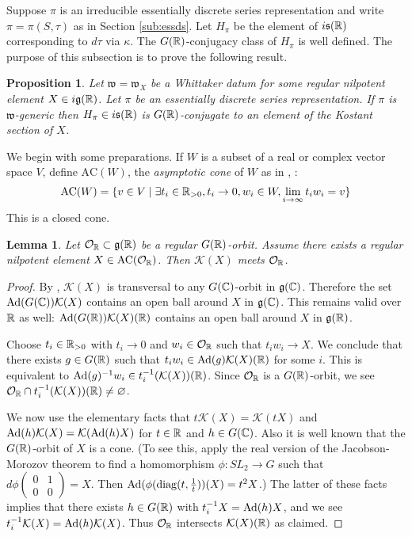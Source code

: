 \documentclass{article}
\newtheorem{lem}[thm]{Lemma}
\newtheorem{pro}[thm]{Proposition}
\theoremstyle{definition}
\numberwithin{equation}{section}
\renewcommand{\-}{\hyp{}}
\newcommand{\s}{\mathfrak s}
\newcommand{\g}{\mathfrak g}
\renewcommand{\O}{\mathcal O}
\newcommand{\K}{\mathcal K}
\newcommand{\w}{\mathfrak w}
\newcommand{\AC}{\mathrm{AC}}
\begin{document}
Suppose $\pi$ is an irreducible essentially discrete series representation and write $\pi=\pi(S,\tau)$ as in Section  \ref{sub:essds}. Let $H_\pi$ be the element of $i\s(\R)$ corresponding to $d\tau$ via $\kappa$. The $G(\mathbb{R})$-conjugacy class of $H_\pi$ is well defined. The purpose of this subsection is to prove the following result.

	

\begin{pro}
  \label{p:whittaker}
Let $\w=\w_X$ be a Whittaker datum for some regular nilpotent element $X\in i\g(\R)$. Let $\pi$ be an essentially discrete series representation. If $\pi$ is $\w$-generic then $H_\pi\in i\s(\R)$ is $G(\mathbb{R})$-conjugate to an element of the Kostant section of $X$.
\end{pro}

We begin with some preparations. If $W$ is a subset of a real or complex vector space $V$, define  $\AC(W)$,  the  {\it asymptotic cone} of $W$ as in   \cite[Proposition 3.7]{bvlocal}, \cite[Definition 2.9]{avav}:
$$
\AC(W)=\{v\in V\mid \exists t_i\in \R_{>0},t_i\rightarrow 0,w_i\in W,\lim_{i\rightarrow\infty}t_i w_i=v\}
$$
This is a closed cone. 

\begin{lem} \label{lem:g1}
Let $\O_\R\subset \g(\R)$ be a regular $G(\mathbb{R})$-orbit. Assume there exists a regular nilpotent element $X\in\AC(\O_\R)$. Then $\K(X)$ meets $\O_\R$.
\end{lem}

\begin{proof}
By \cite{Kos63}, $\K(X)$ is transversal to any $G(\mathbb{C})$-orbit in $\g(\C)$. Therefore the set $\tx{Ad}(G(\C))\K(X)$ contains an open ball around $X$ in $\g(\C)$. This remains valid over $\mathbb{R}$ as well: $\tx{Ad}(G(\R))\K(X)(\R)$ contains an open ball around $X$ in $\g(\R)$.

Choose $t_i \in \mathbb{R}_{>0}$ with $t_i \to 0$ and $w_i \in \O_\R$ such that $t_iw_i \to X$. We conclude that there exists $g \in G(\mathbb{R})$ such that $t_iw_i \in \tx{Ad}(g)\K(X)(\R)$ for some $i$. This is equivalent to $\tx{Ad}(g)^{-1}w_i \in t_i^{-1}(\K(X))(\R)$. Since $\O_\R$ is a $G(\mathbb{R})$-orbit, we see $\O_\R \cap t_i^{-1}(\K(X))(\R) \neq \varnothing$. 

We now use the elementary facts that $t\K(X)=\K(tX)$ and $\tx{Ad}(h)\K(X)=\K(\tx{Ad}(h)X)$ for $t \in \mathbb{R}$ and $h \in G(\mathbb{C})$.
Also it is well known that the $G(\mathbb{R})$-orbit of $X$ is a cone. (To see this, apply the real version of the Jacobson-Morozov theorem
\cite[Theorem 9.2.1]{CM} to  find a homomorphism $\phi:SL_2\rightarrow G$ such that $d\phi\begin{pmatrix}0&1\\0&0\end{pmatrix}=X$.
Then $\textrm{Ad}(\phi(\mathrm{diag}(t,\frac 1t))(X)=t^2X$.)
The latter of these facts implies that there exists $h \in G(\mathbb{R})$ with $t_i^{-1}X=\textrm{Ad}(h)X$, and we see $t_i^{-1}\K(X)=\tx{Ad}(h)\K(X)$. Thus $\O_\R$ intersects $\K(X)(\R)$ as claimed.
\end{proof}
\end{document}
